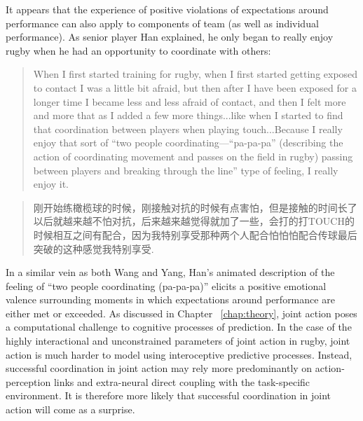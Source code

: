 \begin{CJK}{UTF8}{gbsn}
It appears that the experience of positive violations of expectations around performance can also apply to components of team (as well as individual performance).  As senior player Han explained, he only began to really enjoy rugby when he had an opportunity to coordinate with others:

\begin{quotation}
    When I first started training for rugby, when I first started getting exposed to contact I was a little bit afraid, but then after I have been exposed for a longer time I became less and less afraid of contact, and then I felt more and more that as I added a few more things...like when I started to find that coordination between players when playing touch...Because I really enjoy that sort of ``two people coordinating---``pa-pa-pa'' (describing the action of coordinating movement and passes on the field in rugby) passing between players and breaking through the line'' type of feeling, I really enjoy it.
\end{quotation}

\begin{quotation}
  	刚开始练橄榄球的时候，刚接触对抗的时候有点害怕，但是接触的时间长了以后就越来越不怕对抗，后来越来越觉得就加了一些，会打的打TOUCH的时候相互之间有配合，因为我特别享受那种两个人配合怕怕怕配合传球最后突破的这种感觉我特别享受.
\end{quotation}

In a similar vein as both Wang and Yang, Han's animated description of the feeling of ``two people coordinating (pa-pa-pa)'' elicits a positive emotional valence surrounding moments in which expectations around performance are either met or exceeded.  As discussed in Chapter ~\ref{chap:theory}, joint action poses a computational challenge to cognitive processes of prediction.   In the case of the highly interactional and unconstrained parameters of joint action in rugby, joint action is much harder to model using interoceptive predictive processes.  Instead, successful coordination in joint action may rely more predominantly on action-perception links and extra-neural direct coupling with the task-specific environment. It is therefore more likely that successful coordination in joint action will come as a surprise.


\end{CJK}
